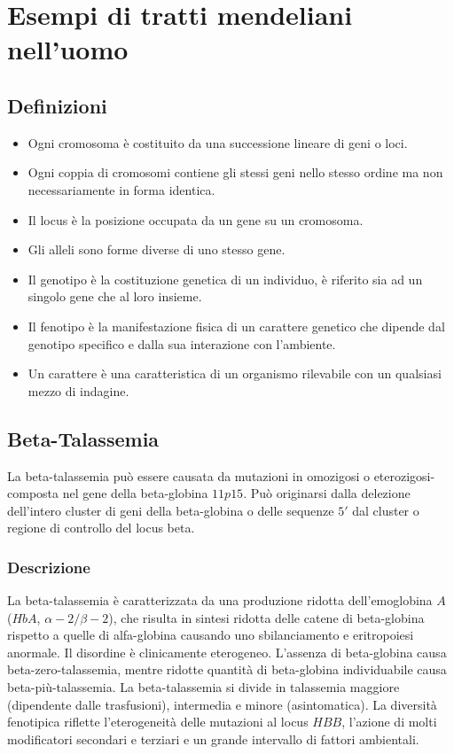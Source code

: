 \section{Esempi di tratti mendeliani nell'uomo}
\subsection{Definizioni}
\begin{itemize}
	\item Ogni cromosoma \`e costituito da una successione lineare di geni o loci.
	\item Ogni coppia di cromosomi contiene gli stessi geni nello stesso ordine ma non necessariamente in forma identica.
	\item Il locus \`e la posizione occupata da un gene su un cromosoma.
	\item Gli alleli sono forme diverse di uno stesso gene. 
	\item Il genotipo \`e la costituzione genetica di un individuo, \`e riferito sia ad un singolo gene che al loro insieme.
	\item Il fenotipo \`e la manifestazione fisica di un carattere genetico che dipende dal genotipo specifico e dalla sua interazione con l'ambiente. 
	\item Un carattere \`e una caratteristica di un organismo rilevabile con un qualsiasi mezzo di indagine. 
\end{itemize}
\subsection{Beta-Talassemia}
La beta-talassemia pu\`o essere causata da mutazioni in omozigosi o eterozigosi-composta nel gene della beta-globina $11p15$. Pu\`o originarsi dalla delezione dell'intero cluster di 
geni della beta-globina o delle sequenze $5'$ dal cluster o regione di controllo del locus beta. 
\subsubsection{Descrizione}
La beta-talassemia \`e caratterizzata da una produzione ridotta dell'emoglobina $A$ ($HbA$, $\alpha-2/\beta-2$), che risulta in sintesi ridotta delle catene di beta-globina rispetto
a quelle di alfa-globina causando uno sbilanciamento e eritropoiesi anormale. Il disordine \`e clinicamente eterogeneo. L'assenza di beta-globina causa beta-zero-talassemia, mentre
ridotte quantit\`a di beta-globina individuabile causa beta-pi\`u-talassemia. La beta-talassemia si divide in talassemia maggiore (dipendente dalle trasfusioni), intermedia e minore
(asintomatica). La diversit\`a fenotipica riflette l'eterogeneit\`a delle mutazioni al locus $HBB$, l'azione di molti modificatori secondari e terziari e un grande intervallo di 
fattori ambientali. 
